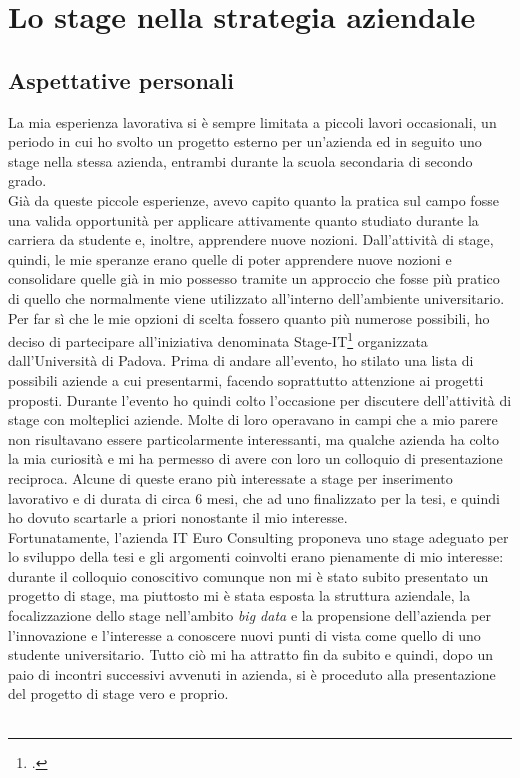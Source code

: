 
\chapter{Lo stage nella strategia aziendale}
\label{cap:lo stage nella strategia aziendale}

\section{Aspettative personali}
La mia esperienza lavorativa si è sempre limitata a piccoli lavori occasionali, un periodo in cui ho svolto un progetto esterno per un'azienda ed in seguito uno stage nella stessa azienda, entrambi durante la scuola secondaria di secondo grado.\\
Già da queste piccole esperienze, avevo capito quanto la pratica sul campo fosse una valida opportunità per applicare attivamente quanto studiato durante la carriera da studente e, inoltre, apprendere nuove nozioni. 
Dall'attività di stage, quindi, le mie speranze erano quelle di poter apprendere nuove nozioni e consolidare quelle già in mio possesso tramite un approccio che fosse più pratico di quello che normalmente viene utilizzato all'interno dell'ambiente universitario.
Per far sì che le mie opzioni di scelta fossero quanto più numerose possibili, ho deciso di partecipare all'iniziativa denominata Stage-IT\footcite{http://informatica.math.unipd.it/laurea/stageit.html} organizzata dall'Università di Padova. Prima di andare all'evento, ho stilato una lista di possibili aziende a cui presentarmi, facendo soprattutto attenzione ai progetti proposti. Durante l'evento ho quindi colto l'occasione per discutere dell'attività di stage con molteplici aziende. Molte di loro operavano in campi che a mio parere non risultavano essere particolarmente interessanti, ma qualche azienda ha colto la mia curiosità e mi ha permesso di avere con loro un colloquio di presentazione reciproca. Alcune di queste erano più interessate a stage per inserimento lavorativo e di durata di circa 6 mesi, che ad uno finalizzato per la tesi, e quindi ho dovuto scartarle a priori nonostante il mio interesse. \\
Fortunatamente, l'azienda IT Euro Consulting proponeva uno stage adeguato per lo sviluppo della tesi e gli argomenti coinvolti erano pienamente di mio interesse: durante il colloquio conoscitivo comunque non mi è stato subito presentato un progetto di stage, ma piuttosto mi è stata esposta la struttura aziendale, la focalizzazione dello stage nell'ambito \textit{big data} e la propensione dell'azienda per l'innovazione e l'interesse a conoscere nuovi punti di vista come quello di uno studente universitario. Tutto ciò mi ha attratto fin da subito e quindi, dopo un paio di incontri successivi avvenuti in azienda, si è proceduto alla presentazione del progetto di stage vero e proprio.\\\\
